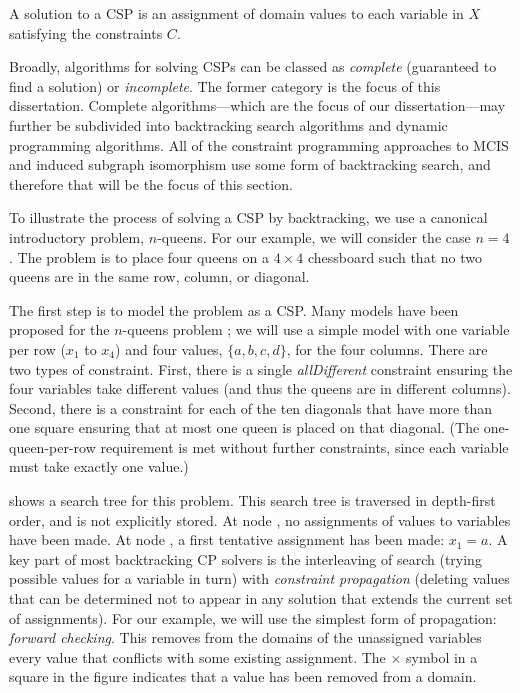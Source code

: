 A solution to a CSP is an assignment of domain values to each variable in $X$
satisfying the constraints $C$.

Broadly, algorithms for solving CSPs can be classed as \emph{complete} (guaranteed to find a solution)
or \emph{incomplete}. The former category is the focus of this dissertation.
Complete algorithms---which are the focus of our dissertation---may further
be subdivided into backtracking search algorithms and dynamic programming
algorithms. All of the constraint programming approaches to MCIS and induced
subgraph isomorphism use some form of backtracking search, and therefore that will
be the focus of this section.

To illustrate the process of solving a CSP by backtracking, we use a canonical
introductory problem, $n$-queens. For our example, we will consider the case
$n=4$. The problem is to place four queens on a $4 \times 4$ chessboard such
that no two queens are in the same row, column, or diagonal.

The first step is to model the problem as a CSP. Many models have been proposed
for the $n$-queens problem \citep{DBLP:reference/fai/Smith06}; we will use a
simple model with one variable per row ($x_1$ to $x_4$) and four values, $\{a, b, c, d\}$, for
the four columns.  There are two types of constraint. First, there is a single
\emph{allDifferent} constraint ensuring the four variables take different
values (and thus the queens are in different columns). Second, there is a
constraint for each of the ten diagonals that have more than one square
ensuring that at most one queen is placed on that diagonal.
(The one-queen-per-row requirement is met without further constraints,
since each variable must take exactly one value.)

 shows a search tree for this problem.
This search tree is traversed in depth-first order, and is not explicitly
stored.
At node ,
no assignments of values to variables have been made. At node , a first
tentative assignment has been made: $x_1=a$. A key part of most backtracking CP
solvers is the interleaving of search (trying possible values for a variable
in turn) with \emph{constraint propagation} (deleting values that can be
determined not to appear in any solution that extends the current set of
assignments). For our example, we will use the simplest form of propagation:
\emph{forward checking}. This removes from the domains of the unassigned variables
every value that conflicts with some existing assignment. The $\times$ symbol
in a square in the figure indicates that a value has been removed from a domain.

